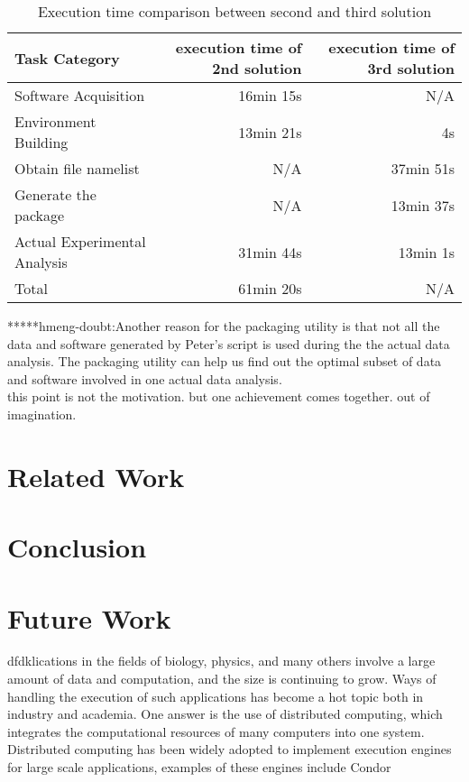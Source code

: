\documentclass{article}
\begin{document}
\begin{table}
    \centering
    \begin{tabular}{|l|r|r|}
    \hline
    Task Category & execution time of 2nd solution & execution time of 3rd solution \\ \hline
    Software Acquisition & 16min 15s & N/A \\ \hline
    Environment Building & 13min 21s  & 4s \\ \hline
    Obtain file namelist & N/A & 37min 51s \\ \hline
    Generate the package & N/A & 13min 37s \\ \hline
    Actual Experimental Analysis & 31min 44s & 13min 1s \\ \hline
    Total & 61min 20s & N/A \\ \hline
    \end{tabular}
    \caption{Execution time comparison between second and third solution}
    \label{table:time-2nd3rd}
\end{table}    

*****hmeng-doubt:Another reason for the packaging utility is that not all the data and software generated by Peter’s script is used during the the actual data analysis. The packaging utility can help us find out the optimal subset of data and software involved in one actual data analysis. \\
this point is not the motivation. but one achievement comes together. out of imagination.\\

\section{Related Work }

\section{Conclusion}

\section{Future Work}




dfdk\cite{Laboratories79make}lications in the fields of biology, physics, and many others involve a large amount of data and computation, and the size is continuing to grow. Ways of handling the execution of such applications has become a hot topic both in industry and academia. One answer is the use of distributed computing, which integrates the computational resources of many computers into one system. Distributed computing has been widely adopted to implement execution engines for large scale applications, examples of these engines include Condor\\



\end{document}
